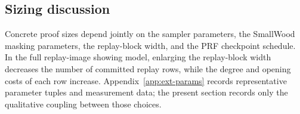 \subsection{Sizing discussion}
Concrete proof sizes depend jointly on the sampler parameters, the SmallWood masking parameters, the replay-block width,
and the PRF checkpoint schedule. In the full replay-image showing model, enlarging the replay-block width decreases the
number of committed replay rows, while the degree and opening costs of each row increase. Appendix~\ref{app:ext-params}
records representative parameter tuples and measurement data; the present section records only the qualitative coupling
between those choices.
